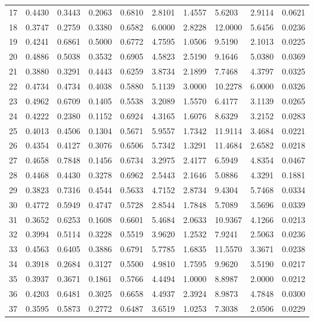 \begin{longtable}{ p{}  p{}  p{}  p{}  p{} p{}  p{} p{} p{} p{}}
17	&	0.4430	&	0.3443	&	0.2063	&	0.6810	&	2.8101	&	1.4557	&	5.6203	&	2.9114	&	0.0621	\\
18	&	0.3747	&	0.2759	&	0.3380	&	0.6582	&	6.0000	&	2.8228	&	12.0000	&	5.6456	&	0.0236	\\
19	&	0.4241	&	0.6861	&	0.5000	&	0.6772	&	4.7595	&	1.0506	&	9.5190	&	2.1013	&	0.0225	\\
20	&	0.4886	&	0.5038	&	0.3532	&	0.6905	&	4.5823	&	2.5190	&	9.1646	&	5.0380	&	0.0369	\\
21	&	0.3880	&	0.3291	&	0.4443	&	0.6259	&	3.8734	&	2.1899	&	7.7468	&	4.3797	&	0.0325	\\
22	&	0.4734	&	0.4734	&	0.4038	&	0.5880	&	5.1139	&	3.0000	&	10.2278	&	6.0000	&	0.0326	\\
23	&	0.4962	&	0.6709	&	0.1405	&	0.5538	&	3.2089	&	1.5570	&	6.4177	&	3.1139	&	0.0265	\\
24	&	0.4222	&	0.2380	&	0.1152	&	0.6924	&	4.3165	&	1.6076	&	8.6329	&	3.2152	&	0.0283	\\
25	&	0.4013	&	0.4506	&	0.1304	&	0.5671	&	5.9557	&	1.7342	&	11.9114	&	3.4684	&	0.0221	\\
26	&	0.4354	&	0.4127	&	0.3076	&	0.6506	&	5.7342	&	1.3291	&	11.4684	&	2.6582	&	0.0218	\\
27	&	0.4658	&	0.7848	&	0.1456	&	0.6734	&	3.2975	&	2.4177	&	6.5949	&	4.8354	&	0.0467	\\
28	&	0.4468	&	0.4430	&	0.3278	&	0.6962	&	2.5443	&	2.1646	&	5.0886	&	4.3291	&	0.1881	\\
29	&	0.3823	&	0.7316	&	0.4544	&	0.5633	&	4.7152	&	2.8734	&	9.4304	&	5.7468	&	0.0334	\\
30	&	0.4772	&	0.5949	&	0.4747	&	0.5728	&	2.8544	&	1.7848	&	5.7089	&	3.5696	&	0.0339	\\
31	&	0.3652	&	0.6253	&	0.1608	&	0.6601	&	5.4684	&	2.0633	&	10.9367	&	4.1266	&	0.0213	\\
32	&	0.3994	&	0.5114	&	0.3228	&	0.5519	&	3.9620	&	1.2532	&	7.9241	&	2.5063	&	0.0236	\\
33	&	0.4563	&	0.6405	&	0.3886	&	0.6791	&	5.7785	&	1.6835	&	11.5570	&	3.3671	&	0.0238	\\
34	&	0.3918	&	0.2684	&	0.3127	&	0.5500	&	4.9810	&	1.7595	&	9.9620	&	3.5190	&	0.0217	\\
35	&	0.3937	&	0.3671	&	0.1861	&	0.5766	&	4.4494	&	1.0000	&	8.8987	&	2.0000	&	0.0212	\\
36	&	0.4203	&	0.6481	&	0.3025	&	0.6658	&	4.4937	&	2.3924	&	8.9873	&	4.7848	&	0.0300	\\
37	&	0.3595	&	0.5873	&	0.2772	&	0.6487	&	3.6519	&	1.0253	&	7.3038	&	2.0506	&	0.0229	\\

\end{longtable}
